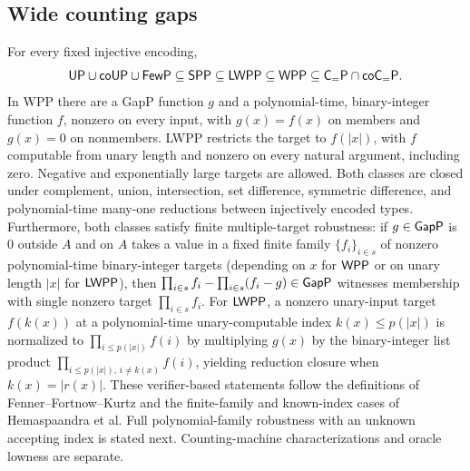 \begin{result}
\subsection{Wide counting gaps}
For every fixed injective encoding,
\[
\mathsf{UP}\cup\mathsf{coUP}\cup\mathsf{FewP}\subseteq\mathsf{SPP}\subseteq\mathsf{LWPP}\subseteq\mathsf{WPP}
\subseteq\mathsf{C}_{=}\mathsf{P}\cap\mathsf{coC}_{=}\mathsf{P}.
\]
In WPP there are a GapP function $g$ and a polynomial-time, binary-integer
function $f$, nonzero on every input, with $g(x)=f(x)$ on members and $g(x)=0$
on nonmembers. LWPP restricts the target to $f(|x|)$, with $f$ computable from
unary length and nonzero on every natural argument, including zero. Negative
and exponentially large targets are allowed. Both classes are closed under
complement, union, intersection, set difference, symmetric difference, and
polynomial-time many-one reductions between injectively encoded types.
Furthermore, both classes satisfy finite multiple-target robustness: if $g\in\mathsf{GapP}$
is $0$ outside $A$ and on $A$ takes a value in a fixed finite family $\{f_i\}_{i\in s}$
of nonzero polynomial-time binary-integer targets (depending on $x$ for $\mathsf{WPP}$ or
on unary length $|x|$ for $\mathsf{LWPP}$), then $\prod_{i\in s}f_i-\prod_{i\in s}(f_i-g)\in\mathsf{GapP}$
witnesses membership with single nonzero target $\prod_{i\in s}f_i$. For $\mathsf{LWPP}$, a
nonzero unary-input target $f(k(x))$ at a polynomial-time unary-computable index $k(x)\le p(|x|)$
is normalized to $\prod_{i\le p(|x|)}f(i)$ by multiplying $g(x)$ by the binary-integer list
product $\prod_{i\le p(|x|),\,i\ne k(x)}f(i)$, yielding reduction closure when $k(x)=|r(x)|$.
These verifier-based statements follow the definitions of Fenner--Fortnow--Kurtz
and the finite-family and known-index cases of Hemaspaandra et al. Full polynomial-family
robustness with an unknown accepting index is stated next. Counting-machine
characterizations and oracle lowness are separate.
\citep{FennerFortnowKurtz1994}\citep[Definitions 2.4--2.5 and Section 3]{HemaspaandraEtAl2018}

\end{result}
